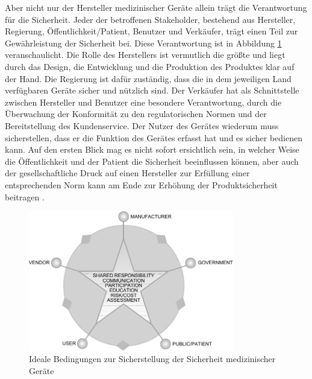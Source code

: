 \documentclass[a4paper,12pt]{report}
\begin{document}
Aber nicht nur der Hersteller medizinischer Geräte allein trägt die Verantwortung für die Sicherheit. Jeder der betroffenen Stakeholder, bestehend aus Hersteller, Regierung, Öffentlichkeit/Patient, Benutzer und Verkäufer, trägt einen Teil zur Gewährleistung der Sicherheit bei. Diese Verantwortung ist in Abbildung \ref{qs_shared_resp} veranschaulicht. Die Rolle des Herstellers ist vermutlich die größte und liegt durch das Design, die Entwicklung und die Produktion des Produktes klar auf der Hand. Die Regierung ist dafür zuständig, dass die in dem jeweiligen Land verfügbaren Geräte sicher und nützlich sind. Der Verkäufer hat als Schnittstelle zwischen Hersteller und Benutzer eine besondere Verantwortung, durch die Überwachung der Konformität zu den regulatorischen Normen und der Bereitstellung des Kundenservice. Der Nutzer des Gerätes wiederum muss sicherstellen, dass er die Funktion des Gerätes erfasst hat und es sicher bedienen kann. Auf den ersten Blick mag es nicht sofort ersichtlich sein, in welcher Weise die Öffentlichkeit und der Patient die Sicherheit beeinflussen können, aber auch der gesellschaftliche Druck auf einen Hersteller zur Erfüllung einer entsprechenden Norm kann am Ende zur Erhöhung der Produktsicherheit beitragen \citep[vgl.][S. 7f.]{Cheng2003}.
\begin{figure}[ht]
\centering
\includegraphics[width=0.8\textwidth]{Images/qs_shared_resp}
\caption[Ideale Bedingungen zur Sicherstellung der Sicherheit medizinischer Geräte]{Ideale Bedingungen zur Sicherstellung der Sicherheit medizinischer Geräte \citep[S. 8]{Cheng2003}}
\label{qs_shared_resp}
\end{figure}
\end{document}
